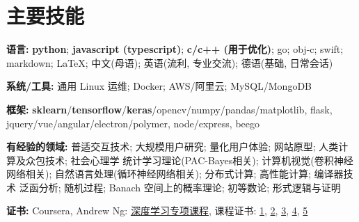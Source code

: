\section{\textbf{主要技能}}
\resumeSubHeadingListStart
\item{
  \textbf{语言:}{ \textbf{python}; \textbf{javascript (typescript)}; \textbf{c/c++ (用于优化)}; go; obj-c; swift; markdown; \LaTeX; 中文(母语); 英语(流利, 专业交流); 德语(基础, 日常会话)}
}
\item{
 \textbf{系统/工具:}{ 通用 Linux 运维; Docker; AWS/阿里云; MySQL/MongoDB }
}
\item{
 \textbf{框架:}{ \textbf{sklearn}/\textbf{tensorflow}/\textbf{keras}/opencv/numpy/pandas/matplotlib, flask, jquery/vue/angular/electron/polymer, node/express, beego}
}
\item{
  \textbf{有经验的领域:}{ 
    \resumeItemListStart
       { 普适交互技术; 大规模用户研究; 量化用户体验; 网站原型; 人类计算及众包技术; 社会心理学}
       { 统计学习理论(PAC-Bayes相关); 计算机视觉(卷积神经网络相关); 自然语言处理(循环神经网络相关); 分布式计算; 高性能计算; 编译器技术}
       { 泛函分析; 随机过程; Banach 空间上的概率理论; 初等数论; 形式逻辑与证明}
   \resumeItemListEnd
  }
}
\item{
 \textbf{证书:}{
  Coursera, Andrew Ng: \href{https://www.coursera.org/account/accomplishments/specialization/QGH8ZVJ6J2L2}{深度学习专项课程}, 课程证书:
  \href{https://www.coursera.org/account/accomplishments/verify/YH4NT7HHN263}{1}, 
  \href{https://www.coursera.org/account/accomplishments/verify/QGH3GNGF6BM4}{2}, 
  \href{https://www.coursera.org/account/accomplishments/verify/6VU45R2SZEF6}{3},
  \href{https://www.coursera.org/account/accomplishments/verify/LF3K9BQQDLVL}{4},
  \href{https://www.coursera.org/account/accomplishments/verify/JQFLW2DPYAGW}{5}
 }
}
\resumeSubHeadingListEnd